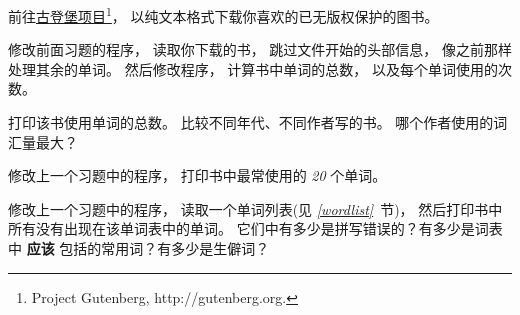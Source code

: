 \begin{exercise}


前往\href{http://gutenberg.org}{古登堡项目\footnote{Project Gutenberg, \url{http://gutenberg.org}.}}， 以纯文本格式下载你喜欢的已无版权保护的图书。



修改前面习题的程序， 读取你下载的书，
跳过文件开始的头部信息， 像之前那样处理其余的单词。
然后修改程序， 计算书中单词的总数， 以及每个单词使用的次数。



打印该书使用单词的总数。   比较不同年代、不同作者写的书。
哪个作者使用的词汇量最大？

\end{exercise}

\begin{exercise}

修改上一个习题中的程序， 打印书中最常使用的 {\em 20} 个单词。
\end{exercise}

\begin{exercise}

修改上一个习题中的程序， 读取一个单词列表(见 {\em \ref{wordlist}}~节)，
然后打印书中所有没有出现在该单词表中的单词。
它们中有多少是拼写错误的？有多少是词表中 {\bf 应该} 包括的常用词？有多少是生僻词？
\end{exercise}


